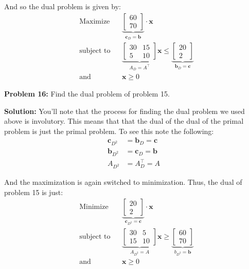 \documentclass{article}
\renewcommand\vec{\mathbf}
\begin{document}
And so the dual problem is given by:
$$\begin{aligned}
    &{\text{Maximize}}
    &&\underbrace{\begin{bmatrix}
        60\\70
    \end{bmatrix}}_{\vec c_D=\vec b}\cdot\vec x\\
    &{\text{subject to}}
    &&\underbrace{\begin{bmatrix}
        30&15\\5&10
    \end{bmatrix}}_{A_D=A^\top}\vec x\le\underbrace{\begin{bmatrix}
        20\\2
    \end{bmatrix}}_{\vec b_D=\vec c}\\
    &{\text{and}}
    &&\vec x\ge 0
\end{aligned}$$
\bigskip

\noindent\textbf{Problem 16:} Find the dual problem of problem 15.
\bigskip

\noindent\textbf{Solution:} You'll note that the process for finding the dual problem we used above is involutory. This means that that the dual of the dual of the primal problem is just the primal problem. To see this note the following:
\begin{align*}
    \vec c_{D^2}&=\vec b_D=\vec c\\
    \vec b_{D^2}&=\vec c_D=\vec b\\
    A_{D^2}&=A_D^\top=A
\end{align*}

And the maximization is again switched to minimization. Thus, the dual of problem 15 is just:
$$\begin{aligned}
    &{\text{Minimize}}
    &&\underbrace{\begin{bmatrix}
        20\\2
    \end{bmatrix}}_{\vec c_{D^2}=\vec c}\cdot\vec x\\
    &{\text{subject to}}
    &&\underbrace{\begin{bmatrix}
        30&5\\15&10
    \end{bmatrix}}_{A_{D^2}=A}\vec x\ge\underbrace{\begin{bmatrix}
        60\\70
    \end{bmatrix}}_{b_{D^2}=\vec b}\\
    &{\text{and}}
    &&\vec x\ge 0
\end{aligned}$$
\end{document}
